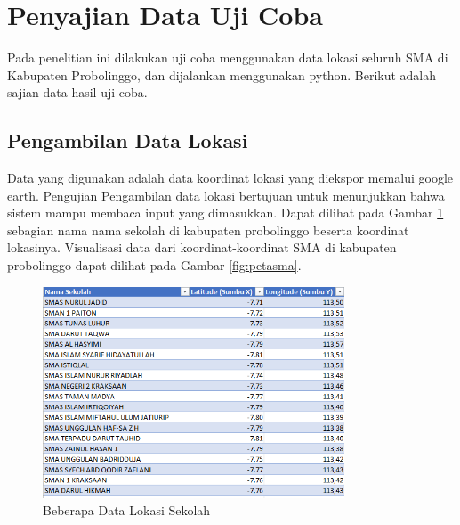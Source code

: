 \section{Penyajian Data Uji Coba}

Pada penelitian ini dilakukan uji coba menggunakan data lokasi seluruh SMA di Kabupaten Probolinggo, dan dijalankan menggunakan python. Berikut adalah sajian data hasil uji coba.

\subsection{Pengambilan Data Lokasi}

Data yang digunakan adalah data koordinat lokasi yang diekspor memalui google earth. Pengujian Pengambilan data lokasi bertujuan untuk menunjukkan bahwa sistem 
mampu membaca input yang dimasukkan. Dapat dilihat pada Gambar \ref{fig:datalok} sebagian nama nama sekolah di kabupaten probolinggo beserta koordinat lokasinya. Visualisasi data dari koordinat-koordinat SMA di kabupaten probolinggo dapat dilihat pada Gambar \ref{fig:petasma}.

\begin{figure}[h!]
  \centering
  \includegraphics[width=0.8\textwidth]{data lokasi sekolah.png}
  \caption{Beberapa Data Lokasi Sekolah}
  \label{fig:datalok}
\end{figure}

